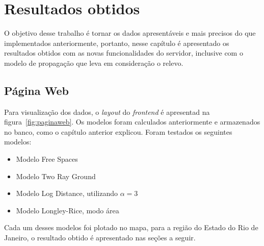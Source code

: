 \chapter{Resultados obtidos}

O objetivo desse trabalho é tornar os dados apresentáveis e mais precisos do que implementados anteriormente, portanto, nesse capítulo é apresentado os resultados obtidos com as novas funcionalidades do servidor, inclusive com o modelo de propagação que leva em consideração o relevo.

\section{Página Web}

Para visualização dos dados, o \textit{layout} do \textit{frontend} é apresentad na figura~\ref{fig:paginaweb}. Os modelos foram calculados anteriormente e armazenados no banco, como o capítulo anterior explicou.
Foram testados os seguintes modelos:

\begin{itemize}
\item Modelo Free Spaces
\item Modelo Two Ray Ground
\item Modelo Log Distance, utilizando \begin{math}\alpha=3 \end{math}
\item Modelo Longley-Rice, modo área
\end{itemize}

Cada um desses modelos foi plotado no mapa, para a região do Estado do Rio de Janeiro, o resultado obtido é apresentado nas seções a seguir.

